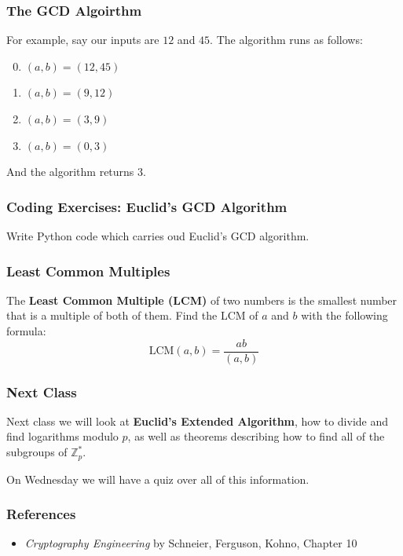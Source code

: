 \documentclass{beamer}
\newcommand{\<}{\langle}
\renewcommand{\>}{\rangle}
\newcommand{\Z}{\mathbb{Z}}
\begin{document}
\begin{frame}
\frametitle{The GCD Algoirthm}

For example, say our inputs are $12$ and $45$. The algorithm runs as follows:
\begin{enumerate}[Loop 1:]
\setcounter{enumi}{-1}
\item $(a, b) = (12, 45)$
\item $(a, b) = (9, 12)$
\item $(a, b) = (3, 9)$
\item $(a, b) = (0, 3)$
\end{enumerate}
And the algorithm returns $3$.
\end{frame}

\begin{frame}
\frametitle{Coding Exercises: Euclid's GCD Algorithm}

Write Python code which carries oud Euclid's GCD algorithm. 
\end{frame}


\begin{frame}
\frametitle{Least Common Multiples}

The \textbf{Least Common Multiple (LCM)} of two numbers is the smallest number that is a multiple of both of them. Find the LCM of $a$ and $b$ with the following formula:
\[
\mathrm{LCM}(a,b) = \frac{ab}{(a,b)}
\]
\end{frame}

\begin{frame}
\frametitle{Next Class}

Next class we will look at \textbf{Euclid's Extended Algorithm}, how to divide and find logarithms modulo $p$, as well as theorems describing how to find all of the subgroups of $\Z_p^*$. \newline

On Wednesday we will have a quiz over all of this information.
\end{frame}
\begin{frame}
\frametitle{References}

\begin{itemize}
\item \emph{Cryptography Engineering} by Schneier, Ferguson, Kohno, Chapter 10
\end{itemize}
\end{frame}
\end{document}
